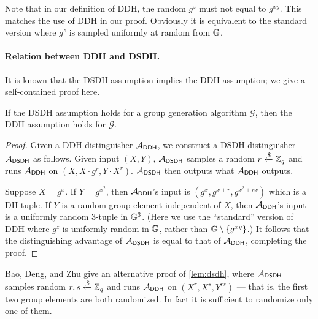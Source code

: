 Note that in our definition of DDH, the random $g^z$ must not equal to $g^{xy}$. This matches the use of DDH in our proof. Obviously it is equivalent to the standard version where $g^z$ is sampled uniformly at random from $\mathbb{G}$.

\paragraph{Relation between DDH and DSDH.}
It is known that the DSDH assumption implies the DDH assumption; we give a self-contained proof here.
\begin{lemma}
\label{lem:dsdh}
If the DSDH assumption holds for a group generation algorithm $\mathcal{G}$, then the DDH assumption holds for $\mathcal{G}$.
\end{lemma}
\begin{proof}
Given a DDH distinguisher $\mathcal{A}_\mathsf{DDH}$, we construct a DSDH distinguisher $\mathcal{A}_\mathsf{DSDH}$ as follows. Given input $(X,Y)$, $\mathcal{A}_\mathsf{DSDH}$ samples a random $r\xleftarrow{\$}\mathbb{Z}_q$ and runs $\mathcal{A}_\mathsf{DDH}$ on $(X,X\cdot g^r,Y\cdot X^r)$. $\mathcal{A}_\mathsf{DSDH}$ then outputs what $\mathcal{A}_\mathsf{DDH}$ outputs.

Suppose $X = g^x$. If $Y = g^{x^2}$, then $\mathcal{A}_\mathsf{DDH}$'s input is $(g^x,g^{x+r},g^{x^2+rx})$ which is a DH tuple. If $Y$ is a random group element independent of $X$, then $\mathcal{A}_\mathsf{DDH}$'s input is a uniformly random 3-tuple in $\mathbb{G}^3$. (Here we use the ``standard'' version of DDH where $g^z$ is uniformly random in $\mathbb{G}$, rather than $\mathbb{G} \setminus \{g^{xy}\}$.) It follows that the distinguishing advantage of $\mathcal{A}_\mathsf{DSDH}$ is equal to that of $\mathcal{A}_\mathsf{DDH}$, completing the proof.
\end{proof}

\begin{remark}
Bao, Deng, and Zhu \cite[Section~3.2]{ICICS:BaoDenZhu03} give an alternative proof of \cref{lem:dsdh}, where $\mathcal{A}_\mathsf{DSDH}$ samples random $r,s\xleftarrow{\$}\mathbb{Z}_q$ and runs $\mathcal{A}_\mathsf{DDH}$ on $(X^r,X^s,Y^{rs})$ --- that is, the first two group elements are both randomized. In fact it is sufficient to randomize only one of them.
\end{remark}



